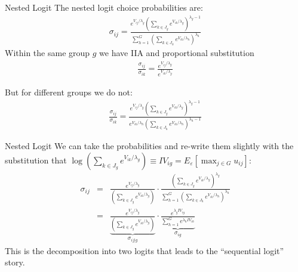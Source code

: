 \documentclass[aspectratio=169,11pt]{beamer}
\begin{document}
\begin{frame}{Nested Logit}
\small
The nested logit choice probabilities are:
\begin{eqnarray*}
\sigma_{ij} = \frac{ e^{V_{ij}/\lambda_g} \left(\sum_{k \in J_g} e^{V_{ik}/\lambda_g} \right)^{\lambda_g -1}}{\sum_{h=1}^G \left(\sum_{k \in J_h} e^{V_{ik}/\lambda_h} \right)^{\lambda_h}}
\end{eqnarray*}
Within the same group $g$ we have IIA and proportional substitution
\begin{eqnarray*}
\frac{\sigma_{ij}}{\sigma_{ik}} = \frac{ e^{V_{ij}/\lambda_g}}{ e^{V_{ik}/\lambda_g}}
\end{eqnarray*}

But for different groups we do not:
\begin{eqnarray*}
\frac{\sigma_{ij}}{\sigma_{ik}} = \frac{ e^{V_{ij}/\lambda_g} \left(\sum_{k \in J_g} e^{V_{ik}/\lambda_g} \right)^{\lambda_g -1}}{ e^{V_{ik}/\lambda_h} \left(\sum_{k \in J_h} e^{V_{ik}/\lambda_h} \right)^{\lambda_h -1}}
\end{eqnarray*}
\end{frame}


\begin{frame}{Nested Logit}
We can take the probabilities and re-write them slightly with the substitution that
$\log \left(\sum_{k \in J_g} e^{V_{ik}/ \lambda_g} \right)\equiv IV_{ig}=E_{\varepsilon}[\max_{j \in G} u_{ij}]$:
\begin{eqnarray*}
\sigma_{ij} &=& \frac{ e^{V_{ij}/\lambda_g}}{ \left(\sum_{k \in J_g} e^{V_{ik}/\lambda_g} \right)}
\cdot
\frac{ \left(\sum_{k \in J_g} e^{V_{ik}/\lambda_g} \right)^{\lambda_g}}{\sum_{h=1}^G \left(\sum_{k \in J_h} e^{V_{ik}/\lambda_h} \right)^{\lambda_h}} \\
&=& \underbrace{\frac{ e^{V_{ij}/\lambda_g}}{ \left(\sum_{k \in J_g} e^{V_{ik}/\lambda_g} \right)}}_{\sigma_{ij|g}}
\cdot
\underbrace{\frac{e^{\lambda_g IV_{ig}}}{\sum_{h=1}^{G} e^{\lambda_h IV_{ih}} }}_{\sigma_{ig}}
\end{eqnarray*}
This is the decomposition into two logits that leads to the ``sequential logit'' story.
\end{frame}
\end{document}
